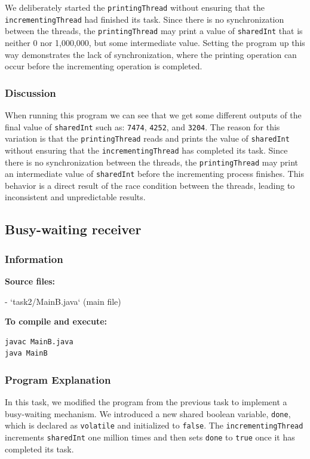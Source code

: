 \documentclass{article}
\begin{document}
We deliberately started the \texttt{printingThread} without ensuring that the \\ \texttt{incrementingThread} had finished its task. Since there is no synchronization between the threads, the \texttt{printingThread} may print a value of \texttt{sharedInt} that is neither 0 nor 1,000,000, but some intermediate value. Setting the program up this way demonstrates the lack of synchronization, where the printing operation can occur before the incrementing operation is completed.

\subsubsection{Discussion}
When running this program we can see that we get some different outputs of the final value of \texttt{sharedInt} such as: \texttt{7474}, \texttt{4252}, and \texttt{3204}. The reason for this variation is that the \texttt{printingThread} reads and prints the value of \texttt{sharedInt} without ensuring that the \texttt{incrementingThread} has completed its task. Since there is no synchronization between the threads, the \texttt{printingThread} may print an intermediate value of \texttt{sharedInt} before the incrementing process finishes. This behavior is a direct result of the race condition between the threads, leading to inconsistent and unpredictable results.



\subsection{Busy-waiting receiver} \label{BusyWait}

\subsubsection{Information}
\textbf{Source files:}

- `task2/MainB.java` (main file)

\textbf{To compile and execute:}
\begin{lstlisting}[style=bash]
javac MainB.java
java MainB
\end{lstlisting}

\subsubsection{Program Explanation}
In this task, we modified the program from the previous task to implement a busy-waiting mechanism. We introduced a new shared boolean variable, \texttt{done}, which is declared as \texttt{volatile} and initialized to \texttt{false}. The \texttt{incrementingThread} increments \texttt{sharedInt} one million times and then sets \texttt{done} to \texttt{true} once it has completed its task.
\end{document}
